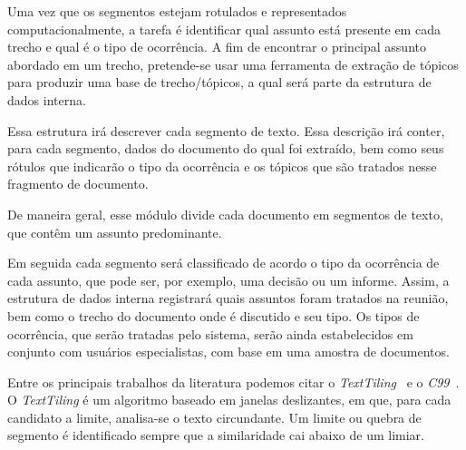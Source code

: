 Uma vez que os segmentos estejam rotulados e representados computacionalmente, a tarefa é identificar qual assunto está presente em cada trecho e qual é o tipo de ocorrência. A fim de encontrar o principal assunto abordado em um trecho, pretende-se usar uma ferramenta de extração de tópicos para produzir uma base de trecho/tópicos, a qual será parte da estrutura de dados interna.

Essa estrutura irá descrever cada segmento de texto. Essa descrição irá conter, para cada segmento, dados do documento do qual foi extraído, bem como seus rótulos que indicarão o tipo da ocorrência e os tópicos que são tratados nesse fragmento de documento.

De maneira geral, esse módulo divide cada documento em segmentos de texto, que contêm um assunto predominante. 


Em seguida cada segmento será classificado de acordo o tipo da ocorrência de cada assunto, que pode ser, por exemplo, uma decisão ou um informe. Assim, a estrutura de dados interna registrará quais assuntos foram tratados na reunião, bem como o trecho do documento onde é discutido e seu tipo. Os tipos de ocorrência, que serão tratadas pelo sistema, serão ainda estabelecidos em conjunto com usuários especialistas, com base em uma amostra de documentos.





















Entre os principais trabalhos da literatura podemos citar o  \textit{TextTiling}~\cite{Hearst1994} e o \textit{C99}~\cite{Choi2000}.
%
O \textit{TextTiling} é um algoritmo baseado em janelas deslizantes, em  que, para cada candidato a limite, analisa-se o texto circundante. Um limite ou quebra de segmento é identificado sempre que a similaridade cai abaixo de um limiar.


